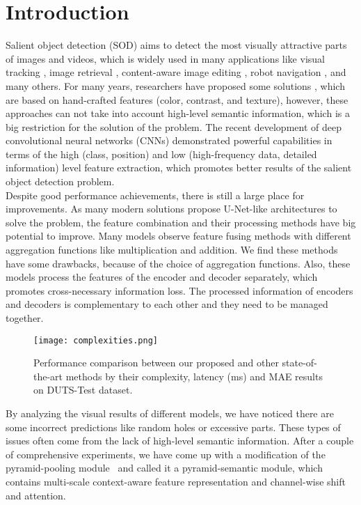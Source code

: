 \documentclass[10pt,twocolumn,letterpaper]{article}
\begin{document}
\section{Introduction}
\label{sec:intro}
Salient object detection (SOD) aims to detect the most visually attractive parts of images and videos, which is widely used in many applications like visual tracking \cite{sal_track}, image retrieval \cite{obj_retr}, content-aware image
editing \cite{RepFinder}, robot navigation \cite{robot_nav}, and many others. For many years, researchers have proposed some solutions \cite{old_sod1, old_sod2, old_sod3, old_sod4}, which are based on hand-crafted features (\eg color, contrast, and texture), however, these approaches can not take into account high-level semantic information, which is a big restriction for the solution of the problem. The recent development of deep convolutional neural networks (CNNs) demonstrated powerful capabilities in terms of the high (\eg class, position) and low (\eg high-frequency data, detailed information) level feature extraction, which promotes better results of the salient object detection problem. \\
Despite good performance achievements, there is still a large place for improvements. As many modern solutions propose U-Net-like architectures to solve the problem, the feature combination and their processing methods have big potential to improve. Many models observe feature fusing methods with different aggregation functions like multiplication and addition. We find these methods have some drawbacks, because of the choice of aggregation functions. Also, these models process the features of the encoder and decoder separately, which promotes cross-necessary information loss. The processed information of encoders and decoders is complementary to each other and they need to be managed together. \\
\begin{figure}[t]
\begin{center}
\texttt{[image: complexities.png]}
\end{center}
\caption{Performance comparison between our proposed and other state-of-the-art methods by their complexity, latency (ms) and MAE results on DUTS-Test dataset.}
\label{fig:complexities}
\end{figure}
By analyzing the visual results of different models, we have noticed there are some incorrect predictions like random holes or excessive parts. These types of issues often come from the lack of high-level semantic information. After a couple of comprehensive experiments, we have come up with a modification of the pyramid-pooling module~\cite{PoolNet} and called it a pyramid-semantic module, which contains multi-scale context-aware feature representation and channel-wise shift and attention.\\
\end{document}
